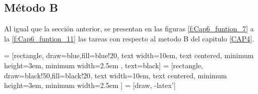         \newpage

  
  
      
    \subsection{Método B}
    
       Al igual que la sección anterior, se presentan en las figuras \eqref{f:Cap6_funtion_7} a la \eqref{f:Cap6_funtion_11} las tareas con respecto al metodo B del capitulo \eqref{CAP4}. 
    
            \hspace{1cm}


     = [rectangle, draw=blue,fill=blue!20, text width=10em, text centered, minimum height=3em, minimum width=2.5em , text=black]
     = [rectangle, draw=black!50,fill=black!20, text width=10em, text centered, minimum height=3em, minimum width=2.5em ]
     = [draw, -latex']

